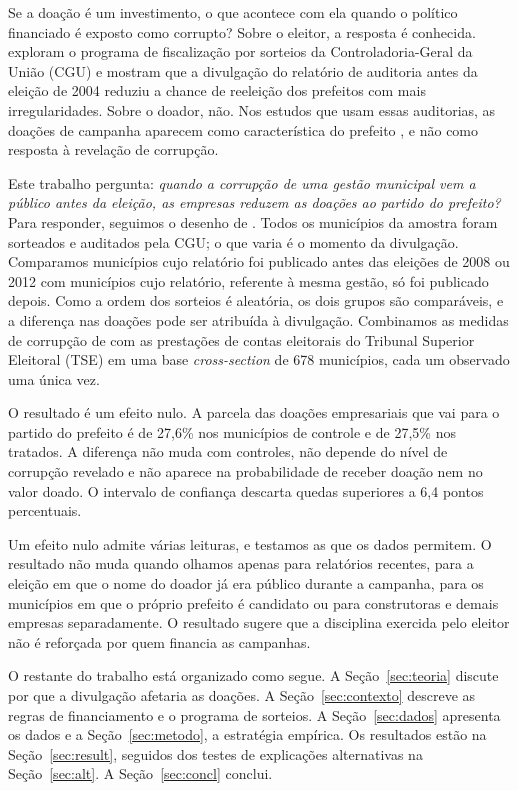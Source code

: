 Se a doação é um investimento, o que acontece com ela quando o político financiado é exposto como corrupto?
Sobre o eleitor, a resposta é conhecida.  exploram o programa de fiscalização
por sorteios da Controladoria-Geral da União (CGU) e mostram que a divulgação do relatório de auditoria
antes da eleição de 2004 reduziu a chance de reeleição dos prefeitos com mais irregularidades. Sobre o
doador, não. Nos estudos que usam essas auditorias, as doações de campanha aparecem como característica
do prefeito \cite{brollotroiano2016}, e não como resposta à revelação de corrupção.

Este trabalho pergunta: \textit{quando a corrupção de uma gestão municipal vem a público antes da eleição,
as empresas reduzem as doações ao partido do prefeito?} Para responder, seguimos o desenho de
. Todos os municípios da amostra foram sorteados e auditados pela CGU; o que
varia é o momento da divulgação. Comparamos municípios cujo relatório foi publicado antes das eleições de
2008 ou 2012 com municípios cujo relatório, referente à mesma gestão, só foi publicado depois. Como a ordem
dos sorteios é aleatória, os dois grupos são comparáveis, e a diferença nas doações pode ser atribuída à
divulgação. Combinamos as medidas de corrupção de  com as prestações de contas
eleitorais do Tribunal Superior Eleitoral (TSE) em uma base \textit{cross-section} de 678 municípios, cada
um observado uma única vez.

O resultado é um efeito nulo. A parcela das doações empresariais que vai para o partido do prefeito é de
27,6\% nos municípios de controle e de 27,5\% nos tratados. A diferença não muda com controles, não depende
do nível de corrupção revelado e não aparece na probabilidade de receber doação nem no valor doado. O
intervalo de confiança descarta quedas superiores a 6,4 pontos percentuais.

Um efeito nulo admite várias leituras, e testamos as que os dados permitem. O resultado não muda quando
olhamos apenas para relatórios recentes, para a eleição em que o nome do doador já era público durante a
campanha, para os municípios em que o próprio prefeito é candidato ou para construtoras e demais empresas
separadamente. O resultado sugere que a disciplina exercida pelo eleitor não é reforçada por quem financia
as campanhas.

O restante do trabalho está organizado como segue. A Seção~\ref{sec:teoria} discute por que a divulgação
afetaria as doações. A Seção~\ref{sec:contexto} descreve as regras de financiamento e o programa de
sorteios. A Seção~\ref{sec:dados} apresenta os dados e a Seção~\ref{sec:metodo}, a estratégia empírica. Os
resultados estão na Seção~\ref{sec:result}, seguidos dos testes de explicações alternativas na
Seção~\ref{sec:alt}. A Seção~\ref{sec:concl} conclui.

